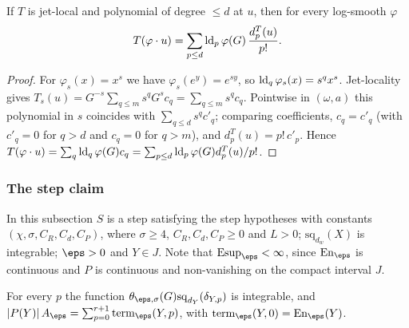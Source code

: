 \begin{lemma}\label{pf:thmS-carrier:leibniz}
If $T$ is jet-local and polynomial of degree $\le d$ at $u$, then for every log-smooth $\varphi$
\[
T(\varphi\cdot u)=\sum_{p\le d}\operatorname{ld}_p\varphi(G)\,\frac{d^T_p(u)}{p!}.
\]
\end{lemma}

\begin{proof}
For $\varphi_s(x)=x^s$ we have $\varphi_s(e^y)=e^{sy}$, so $\operatorname{ld}_q\varphi_s(x)=s^qx^s$. Jet-locality gives
$T_s(u)=G^{-s}\sum_{q\le m}s^qG^sc_q=\sum_{q\le m}s^qc_q$. Pointwise in $(\omega,a)$ this polynomial in $s$ coincides with
$\sum_{q\le d}s^qc'_q$; comparing coefficients, $c_q=c'_q$ (with $c'_q=0$ for $q>d$ and $c_q=0$ for $q>m$), and
$d^T_p(u)=p!\,c'_p$. Hence $T(\varphi\cdot u)=\sum_q\operatorname{ld}_q\varphi(G)c_q=\sum_{p\le d}\operatorname{ld}_p\varphi(G)
d^T_p(u)/p!$.
\end{proof}

\subsubsection{The step claim}
In this subsection $S$ is a step satisfying the step hypotheses with constants $(\chi,\sigma,C_R,C_d,C_P)$, where $\sigma\ge4$,
$C_R,C_d,C_P\ge0$ and $L>0$; $\mathrm{sq}_{d_w}(X)$ is integrable; $\eps>0$ and $Y\in J$. Note that $\mathrm{Esup}_\eps<\infty$,
since $\mathrm{En}_\eps$ is continuous and $P$ is continuous and non-vanishing on the compact interval $J$.

\begin{lemma}\label{pf:thmS-carrier:star}
For every $p$ the function $\theta_{\eps,\sigma}(G)\mathrm{sq}_{d_Y}(\delta_{Y,p})$ is integrable, and
$|P(Y)|\,A_\eps=\sum_{p=0}^{r+1}\mathrm{term}_\eps(Y,p)$, with $\mathrm{term}_\eps(Y,0)=\mathrm{En}_\eps(Y)$.
\end{lemma}

